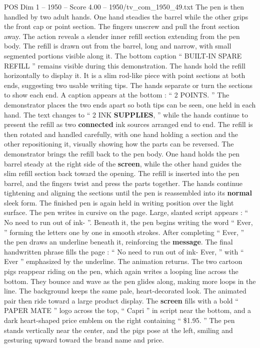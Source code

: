 \begin{textsample}{POS Dim 1 – 1950 – Score 4.00 – 1950/tv\_com\_1950\_49.txt}
The pen is then handled by two adult hands.
One hand steadies the barrel while the other grips the front cap or point section.
The fingers unscrew and pull the front section away.
The action reveals a slender inner refill section extending from the pen body.
The refill is drawn out from the barrel, long and narrow, with small segmented portions visible along it.
The bottom caption “ BUILT-IN SPARE REFILL ” remains visible during this demonstration.
The hands hold the refill horizontally to display it.
It is a slim rod-like piece with point sections at both ends, suggesting two usable writing tips.
The hands separate or turn the sections to show each end.
A caption appears at the bottom : “ 2 POINTS. ” The demonstrator places the two ends apart so both tips can be seen, one held in each hand.
The text changes to “ 2 INK \textbf{SUPPLIES}, ” while the hands continue to present the refill as two \textbf{connected} ink sources arranged end to end.
The refill is then rotated and handled carefully, with one hand holding a section and the other repositioning it, visually showing how the parts can be reversed.
The demonstrator brings the refill back to the pen body.
One hand holds the pen barrel steady at the right side of the \textbf{screen}, while the other hand guides the slim refill section back toward the opening.
The refill is inserted into the pen barrel, and the fingers twist and press the parts together.
The hands continue tightening and aligning the sections until the pen is reassembled into its \textbf{normal} sleek form.
The finished pen is again held in writing position over the light surface.
The pen writes in cursive on the page.
Large, slanted script appears : “ No need to run out of ink- ”.
Beneath it, the pen begins writing the word “ Ever, ” forming the letters one by one in smooth strokes.
After completing “ Ever, ” the pen draws an underline beneath it, reinforcing the \textbf{message}.
The final handwritten phrase fills the page : “ No need to run out of ink- Ever, ” with “ Ever ” emphasized by the underline.
The animation returns.
The two cartoon pigs reappear riding on the pen, which again writes a looping line across the bottom.
They bounce and wave as the pen glides along, making more loops in the line.
The background keeps the same pale, heart-decorated look.
The animated pair then ride toward a large product display.
The \textbf{screen} fills with a bold “ PAPER MATE ” logo across the top, “ Capri ” in script near the bottom, and a dark heart-shaped price emblem on the right containing “ \$1.95. ” The pen stands vertically near the center, and the pigs pose at the left, smiling and gesturing upward toward the brand name and price.

\end{textsample}
